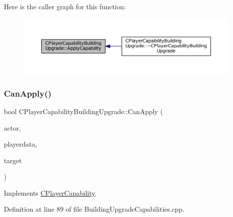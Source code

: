 Here is the caller graph for this function\+:
\nopagebreak
\begin{figure}[H]
\begin{center}
\leavevmode
\includegraphics[width=350pt]{classCPlayerCapabilityBuildingUpgrade_a5e71446b74307f31ce6d6e9bbfd9a681_icgraph}
\end{center}
\end{figure}
\hypertarget{classCPlayerCapabilityBuildingUpgrade_a22de7902bcf6406a3b3a7c51e5c56f35}{}\label{classCPlayerCapabilityBuildingUpgrade_a22de7902bcf6406a3b3a7c51e5c56f35} 
\subsubsection{\texorpdfstring{Can\+Apply()}{CanApply()}}
{\footnotesize\ttfamily bool C\+Player\+Capability\+Building\+Upgrade\+::\+Can\+Apply (\begin{DoxyParamCaption}\item[{std\+::shared\+\_\+ptr$<$ \hyperlink{classCPlayerAsset}{C\+Player\+Asset} $>$}]{actor,  }\item[{std\+::shared\+\_\+ptr$<$ \hyperlink{classCPlayerData}{C\+Player\+Data} $>$}]{playerdata,  }\item[{std\+::shared\+\_\+ptr$<$ \hyperlink{classCPlayerAsset}{C\+Player\+Asset} $>$}]{target }\end{DoxyParamCaption})\hspace{0.3cm}{\ttfamily [virtual]}}



Implements \hyperlink{classCPlayerCapability_ae96263e0950f496492f8baeb877b9554}{C\+Player\+Capability}.



Definition at line 89 of file Building\+Upgrade\+Capabilities.\+cpp.


